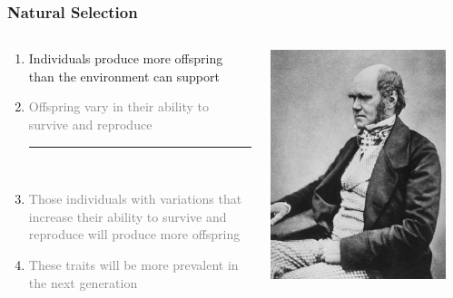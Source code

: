 \documentclass[10pt]{beamer}
\begin{document}
\begin{frame}[t]
\frametitle{Natural Selection}
\vspace{0.5cm}

	\begin{columns}
		\begin{column}{0.7\textwidth}
			\begin{enumerate}
				\item Individuals produce more offspring than the environment can support
				\medskip
				\item \textcolor{gray}{Offspring vary in their ability to survive and reproduce}
				\begin{center}
					\rule{0.5\textwidth}{0.5pt}\\
				\end{center}
				\smallskip
				\item \textcolor{gray}{Those individuals with variations that increase their ability to survive and reproduce will produce more offspring}
				\medskip
				\item \textcolor{gray}{These traits will be more prevalent in the next generation}
			\end{enumerate}
		\end{column}
		
		\begin{column}{0.3\textwidth}
			\begin{center}
				\includegraphics[width=0.9\textwidth]{figures/Darwin.jpg}
			\end{center}
		\end{column}
	\end{columns}
\end{frame}
\end{document}
